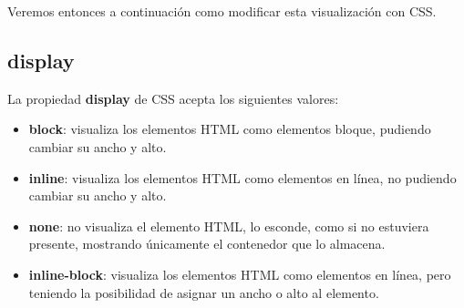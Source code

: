 Veremos entonces a continuación como modificar esta visualización con CSS.


\subsection{display}

La propiedad \textbf{display} de CSS acepta los siguientes valores:
\begin{itemize}
    \item \textbf{block}: visualiza los elementos HTML como elementos bloque, pudiendo cambiar su ancho y alto.
    \item \textbf{inline}: visualiza los elementos HTML como elementos en línea, no pudiendo cambiar su ancho y alto.
    \item \textbf{none}: no visualiza el elemento HTML, lo esconde, como si no estuviera presente, mostrando únicamente el contenedor que lo almacena.
    \item \textbf{inline-block}: visualiza los elementos HTML como elementos en línea, pero teniendo la posibilidad de asignar un ancho o alto al elemento.
\end{itemize}


